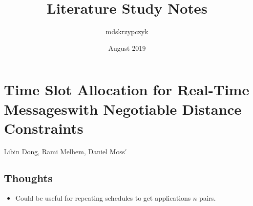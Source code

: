 \documentclass{article}
\title{Literature Study Notes}
\author{mdskrzypczyk }
\date{August 2019}
\begin{document}
\maketitle

\section{Time Slot Allocation for Real-Time Messageswith Negotiable Distance Constraints}
Libin Dong, Rami Melhem, Daniel Moss ́

\subsection{Thoughts}
\begin{itemize}
    \item Could be useful for repeating schedules to get applications $n$ pairs.
\end{itemize}
\end{document}
